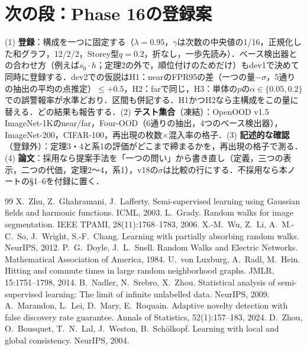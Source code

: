 \documentclass[a4paper,10pt,dvipdfmx]{jsarticle}
\theoremstyle{definition}
\newcommand{\FPR}{FPR95}
\begin{document}
\section{次の段：Phase 16の登録案}
(1) \textbf{登録}：構成を一つに固定する（$\lambda{=}0.95$，$\gamma$は次数の中央値の1/16，正規化した和グラフ，12/2/2，Storey型$q{=}0.2$，折なし，一歩先読み）．ベース検出器との合わせ方（例えば$s_0\cdot h$；定理2の外で，順位付けのためだけ）もdev1で決めて同時に登録する．dev2での仮説はH1：nearの\FPR{}の差（一つの量$-\sigma$，5通りの抽出の平均の点推定）$\le+0.5$，H2：farで同じ，H3：単体の$p$の$\alpha\in\{0.05,0.2\}$での誤警報率が水準どおり．区間も併記する．H1かつH2なら主構成をこの量に替える．どの結果も報告する．(2) \textbf{テスト集合}（凍結）：OpenOOD v1.5 ImageNet-1Kのnear/far，Four-OOD（6通りの抽出，4つのベース検出器），ImageNet-200，CIFAR-100，再出現の枚数$\times$混入率の格子．(3) \textbf{記述的な確認}（登録外）：定理3・4と系1の評価がどこまで締まるかを，再出現の格子で測る．(4) \textbf{論文}：採用なら提案手法を「一つの問い」から書き直し（定義，三つの表示，二つの代価，定理2〜4，系1），v18の$\sigma$は比較の行にする．不採用なら本ノートの\S1--6を付録に置く．

\begin{thebibliography}{99}
\setlength{\itemsep}{0pt}
\footnotesize
{} X.~Zhu, Z.~Ghahramani, J.~Lafferty. Semi-supervised learning using Gaussian fields and harmonic functions. ICML, 2003.
 L.~Grady. Random walks for image segmentation. IEEE TPAMI, 28(11):1768--1783, 2006.
 X.-M.~Wu, Z.~Li, A.~M.-C.~So, J.~Wright, S.-F.~Chang. Learning with partially absorbing random walks. NeurIPS, 2012.
 P.~G.~Doyle, J.~L.~Snell. Random Walks and Electric Networks. Mathematical Association of America, 1984.
 U.~von Luxburg, A.~Radl, M.~Hein. Hitting and commute times in large random neighborhood graphs. JMLR, 15:1751--1798, 2014.
 B.~Nadler, N.~Srebro, X.~Zhou. Statistical analysis of semi-supervised learning: The limit of infinite unlabelled data. NeurIPS, 2009.
 A.~Marandon, L.~Lei, D.~Mary, E.~Roquain. Adaptive novelty detection with false discovery rate guarantee. Annals of Statistics, 52(1):157--183, 2024.
 D.~Zhou, O.~Bousquet, T.~N.~Lal, J.~Weston, B.~Sch\"{o}lkopf. Learning with local and global consistency. NeurIPS, 2004.
\end{thebibliography}
\clearpage
\appendix
\end{document}
